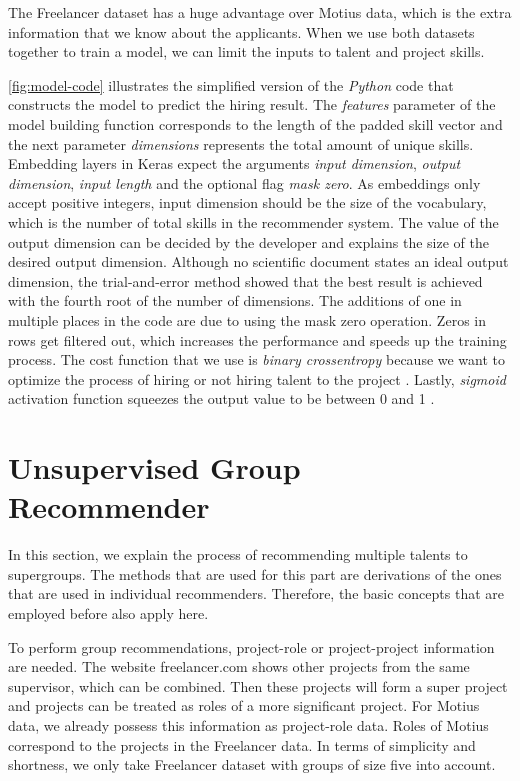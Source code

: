 The Freelancer dataset has a huge advantage over Motius data, which is the extra information that we know about the applicants. When we use both datasets together to train a model, we can limit the inputs to talent and project skills. 

\autoref{fig:model-code} illustrates the simplified version of the \textit{Python} code that constructs the model to predict the hiring result. The \textit{features} parameter of the model building function corresponds to the length of the padded skill vector and the next parameter \textit{dimensions} represents the total amount of unique skills. Embedding layers in Keras expect the arguments \textit{input dimension}, \textit{output dimension}, \textit{input length} and the optional flag \textit{mask zero}. As embeddings only accept positive integers, input dimension should be the size of the vocabulary, which is the number of total skills in the recommender system. The value of the output dimension can be decided by the developer and explains the size of the desired output dimension. Although no scientific document states an ideal output dimension, the trial-and-error method showed that the best result is achieved with the fourth root of the number of dimensions. The additions of one in multiple places in the code are due to using the mask zero operation. Zeros in rows get filtered out, which increases the performance and speeds up the training process. The cost function that we use is \textit{binary crossentropy} because we want to optimize the process of hiring or not hiring talent to the project \cite{murphy2012machine}. Lastly, \textit{sigmoid} activation function squeezes the output value to be between 0 and 1 \cite{pedamonti2018comparison}.


\section{Unsupervised Group Recommender}\label{section:unsupervised-group-rec}

In this section, we explain the process of recommending multiple talents to supergroups. The methods that are used for this part are derivations of the ones that are used in individual recommenders. Therefore, the basic concepts that are employed before also apply here. 

To perform group recommendations, project-role or project-project information are needed. The website freelancer.com shows other projects from the same supervisor, which can be combined. Then these projects will form a super project and projects can be treated as roles of a more significant project. For Motius data, we already possess this information as project-role data. Roles of Motius correspond to the projects in the Freelancer data. In terms of simplicity and shortness, we only take Freelancer dataset with groups of size five into account. 

